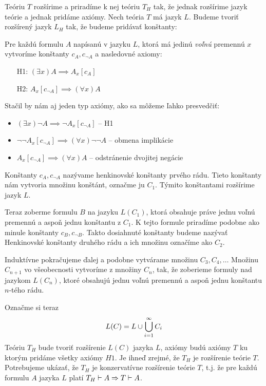 \begin{dokaz}
    Teóriu $T$ rozšírime a priradíme k nej teóriu $T_H$ tak, že
    jednak rozšírime jazyk teórie a jednak pridáme axiómy.
    Nech teória $T$ má jazyk $L$.
    Budeme tvoriť rozšírený jazyk $L_H$ tak, že budeme pridávať konštanty:

    Pre každú formulu $A$ napísanú v jazyku $L$,
    ktorá má jedinú {\it voľnú} premennú $x$ 
    vytvoríme konštanty $c_A, c_{\neg A}$
    a nasledovné axiomy: 
    \begin{itemize}
        \item[H1:]  $(\exists x) A \implies A_x[c_A]$
        \item[H2:]  $A_x[c_{\neg A}] \implies (\forall x) A$
    \end{itemize}

    Stačil by nám aj jeden typ axiómy, ako sa môžeme ľahko presvedčiť:
    \begin{itemize}
        \item $(\exists x) \neg A \implies \neg A_x[c_{\neg A}]$ -- H1
        \item $\neg \neg A_x[c_{\neg A}] \implies
                (\forall x) \neg \neg A$ -- obmena implikácie
        \item $A_x[c_{\neg A}] \implies (\forall x) A$ -- odstránenie
            dvojitej negácie
    \end{itemize}

    Konštanty $c_A, c_{\neg A}$ nazývame henkinovské konštanty prvého
    rádu. Tieto konštanty nám vytvoria množinu konštánt, označme ju
    $C_1$. Týmito konštantami rozšírime jazyk $L$.
    
    Teraz zoberme formulu $B$ na jazyku $L(C_1)$, ktorá obsahuje práve
    jednu voľnú premennú a aspoň jednu konštantu z $C_1$. K tejto
    formule priradíme podobne ako minule konštanty $c_B, c_{\neg B}$.
    Takto dosiahnuté konštanty budeme nazývať Henkinovské konštanty
    druhého rádu a ich množinu označíme ako $C_2$.
    
    Induktívne pokračujeme ďalej a podobne vytvárame množinu $C_3,
    C_4, \dots$
    Množinu $C_{n+1}$ vo všeobecnosti vytvoríme z množiny $C_n$, tak,
    že zoberieme formuly nad jazykom $L(C_n)$, ktoré obsahujú jednu
    voľnú premennú a aspoň jednu konštantu $n$-tého rádu.

    Označme si teraz
    \begin{equation*}
        L(C) = L \cup \bigcup_{i=1}^{\infty} C_i
    \end{equation*}
    Teóriu $T_H$ bude tvoriť rozšírenie $L(C)$ jazyka $L$,
    axiómy budú axiómy $T$ ku ktorým pridáme všetky axiómy $H1$.
    Je ihneď zrejmé, že $T_H$ je rozšírenie teórie $T$.
    Potrebujeme ukázať, že $T_H$ je konzervatívne rozšírenie teórie $T$, t.j.
    že pre každú formulu $A$ jazyka $L$ platí 
    $T_H \vdash A \Rightarrow T \vdash A$.


\end{dokaz}
